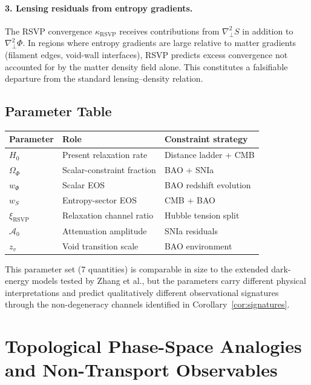 \documentclass[12pt,a4paper]{article}
\theoremstyle{remark}
\newcommand{\Acal}{\mathcal{A}}
\begin{document}
\paragraph{3. Lensing residuals from entropy gradients.}
The RSVP convergence $\kappa_{\mathrm{RSVP}}$ receives contributions from
$\nabla_\perp^2 S$ in addition to $\nabla_\perp^2\Phi$. In regions where
entropy gradients are large relative to matter gradients (filament edges,
void-wall interfaces), RSVP predicts excess convergence not accounted for by
the matter density field alone. This constitutes a falsifiable departure from
the standard lensing--density relation.

\subsection{Parameter Table}

\begin{center}
\begin{tabular}{lll}
\toprule
Parameter & Role & Constraint strategy \\
\midrule
$H_0$ & Present relaxation rate & Distance ladder + CMB \\
$\Omega_\Phi$ & Scalar-constraint fraction & BAO + SNIa \\
$w_\Phi$ & Scalar EOS & BAO redshift evolution \\
$w_S$ & Entropy-sector EOS & CMB + BAO \\
$\xi_{\mathrm{RSVP}}$ & Relaxation channel ratio & Hubble tension split \\
$\Acal_0$ & Attenuation amplitude & SNIa residuals \\
$z_v$ & Void transition scale & BAO environment \\
\bottomrule
\end{tabular}
\end{center}

This parameter set (7 quantities) is comparable in size to the extended
dark-energy models tested by Zhang et al., but the parameters carry different
physical interpretations and predict qualitatively different observational
signatures through the non-degeneracy channels identified in
Corollary~\ref{cor:signatures}.


\section{Topological Phase-Space Analogies and Non-Transport Observables}
\label{sec:singularity}
\end{document}
